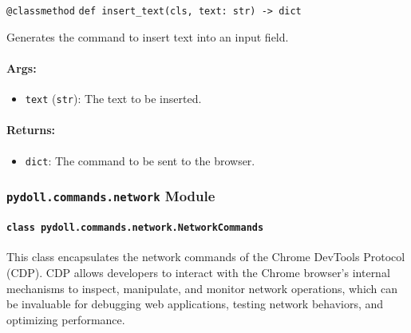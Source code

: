 \documentclass{article}
\begin{document}
\noindent\texttt{@classmethod}
\noindent\texttt{def insert\_text(cls, text: str) -> dict}

\noindent Generates the command to insert text into an input field.

\paragraph{Args:}
\begin{itemize}
    \item \texttt{text} (\texttt{str}): The text to be inserted.
\end{itemize}

\paragraph{Returns:}
\begin{itemize}
    \item \texttt{dict}: The command to be sent to the browser.
\end{itemize}

\subsubsection*{\texttt{pydoll.commands.network} Module}

\paragraph*{\texttt{class pydoll.commands.network.NetworkCommands}}
\noindent This class encapsulates the network commands of the Chrome DevTools Protocol (CDP). CDP allows developers to interact with the Chrome browser's internal mechanisms to inspect, manipulate, and monitor network operations, which can be invaluable for debugging web applications, testing network behaviors, and optimizing performance.
\end{document}
